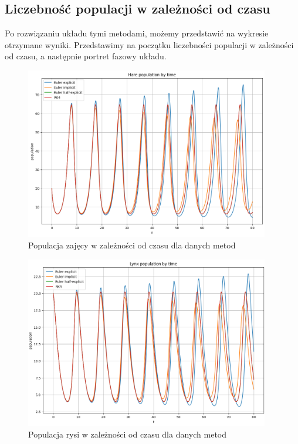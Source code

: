 \documentclass{article}
\begin{document}
\subsection{Liczebność populacji w zależności od czasu}
Po rozwiązaniu układu tymi metodami, możemy przedstawić na wykresie otrzymane wyniki. Przedstawimy na początku liczebności populacji w zależności od czasu, a następnie portret fazowy układu.
\begin{figure}[H]
    \centering
    \includegraphics[width=0.95\textwidth]{1a}
    \caption{Populacja zajęcy w zależności od czasu dla danych metod}
    \label{fig:mesh}
\end{figure}
\begin{figure}[H]
    \centering
    \includegraphics[width=0.95\textwidth]{1b}
    \caption{Populacja rysi w zależności od czasu dla danych metod}
    \label{fig:mesh}
\end{figure}
\end{document}
